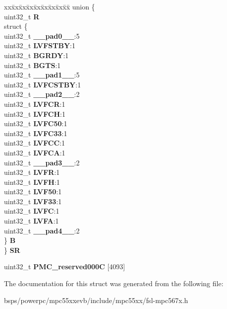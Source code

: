 \begin{DoxyCompactItemize}
\begin{tabbing}
\end{tabbing}\item 
\mbox{\label{structPMC__tag_ac502f39813c1c4115090dd0298615239}} 
\begin{tabbing}
xx\=xx\=xx\=xx\=xx\=xx\=xx\=xx\=xx\=\kill
union \{\\
\>uint32\_t {\bfseries R}\\
\>struct \{\\
\>\>uint32\_t {\bfseries \_\_pad0\_\_}:5\\
\>\>uint32\_t {\bfseries LVFSTBY}:1\\
\>\>uint32\_t {\bfseries BGRDY}:1\\
\>\>uint32\_t {\bfseries BGTS}:1\\
\>\>uint32\_t {\bfseries \_\_pad1\_\_}:5\\
\>\>uint32\_t {\bfseries LVFCSTBY}:1\\
\>\>uint32\_t {\bfseries \_\_pad2\_\_}:2\\
\>\>uint32\_t {\bfseries LVFCR}:1\\
\>\>uint32\_t {\bfseries LVFCH}:1\\
\>\>uint32\_t {\bfseries LVFC50}:1\\
\>\>uint32\_t {\bfseries LVFC33}:1\\
\>\>uint32\_t {\bfseries LVFCC}:1\\
\>\>uint32\_t {\bfseries LVFCA}:1\\
\>\>uint32\_t {\bfseries \_\_pad3\_\_}:2\\
\>\>uint32\_t {\bfseries LVFR}:1\\
\>\>uint32\_t {\bfseries LVFH}:1\\
\>\>uint32\_t {\bfseries LVF50}:1\\
\>\>uint32\_t {\bfseries LVF33}:1\\
\>\>uint32\_t {\bfseries LVFC}:1\\
\>\>uint32\_t {\bfseries LVFA}:1\\
\>\>uint32\_t {\bfseries \_\_pad4\_\_}:2\\
\>\} {\bfseries B}\\
\} {\bfseries SR}\\

\end{tabbing}\item 
\mbox{\label{structPMC__tag_a9796ed057df7bbe44466d609779fb7f2}} 
uint32\+\_\+t {\bfseries P\+M\+C\+\_\+reserved000C} \mbox{[}4093\mbox{]}
\end{DoxyCompactItemize}


The documentation for this struct was generated from the following file\+:\begin{DoxyCompactItemize}
\item 
bsps/powerpc/mpc55xxevb/include/mpc55xx/fsl-\/mpc567x.\+h\end{DoxyCompactItemize}
